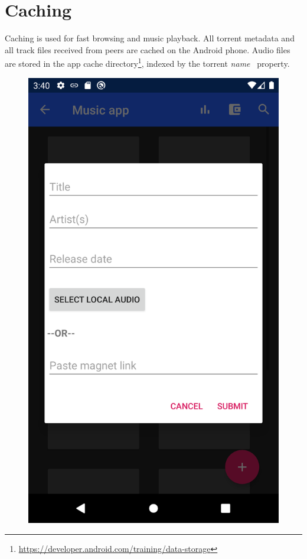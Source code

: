 \section{Caching}
Caching is used for fast browsing and music playback. All torrent metadata and all track files received from peers are cached on the Android phone. Audio files are stored in the app cache directory\footnote{\url{https://developer.android.com/training/data-storage}}, indexed by the torrent \textit{name}~\citep{bittorrentbep3} property. 
\begin{figure}
        \includegraphics[width=\linewidth]{implementation/screenshot-select-tracks.png}

\end{figure}
